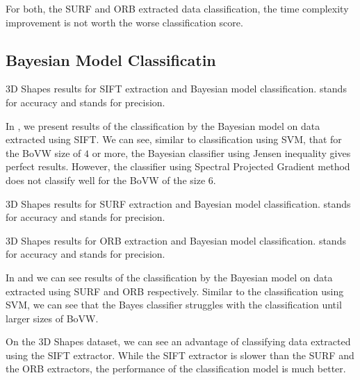 For both, the SURF and ORB extracted data classification, the time complexity improvement is not worth the worse classification score.

\subsection{Bayesian Model Classificatin}
\begin{table}[ht!]
    \centering
    
    \caption[3D Shapes results for SIFT extraction and Bayesian model classification]{3D Shapes results for SIFT extraction and Bayesian model classification.  stands for accuracy and  stands for precision.}
    \label{tab:3d_SIFT_bayes}
\end{table}
In , we present results of the classification by the Bayesian model on data extracted using SIFT. We can see, similar to classification using SVM, that for the BoVW size of $4$ or more, the Bayesian classifier using Jensen inequality gives perfect results. However, the classifier using Spectral Projected Gradient method does not classify well for the BoVW of the size $6$.

\begin{table}[ht!]
    \centering
    
    \caption[3D Shapes results for SURF extraction and Bayesian model classification]{3D Shapes results for SURF extraction and Bayesian model classification.  stands for accuracy and  stands for precision.}
    \label{tab:3d_SURF_bayes}
\end{table}
\begin{table}[ht!]
    \centering
    
    \caption[3D Shapes results for ORB extraction and Bayesian model classification]{3D Shapes results for ORB extraction and Bayesian model classification.  stands for accuracy and  stands for precision.}
    \label{tab:3d_ORB_bayes}
\end{table}
In  and  we can see results of the classification by the Bayesian model on data extracted using SURF and ORB respectively. Similar to the classification using SVM, we can see that the Bayes classifier struggles with the classification until larger sizes of BoVW.

On the 3D Shapes dataset, we can see an advantage of classifying data extracted using the SIFT extractor. While the SIFT extractor is slower than the SURF and the ORB extractors, the performance of the classification model is much better.

